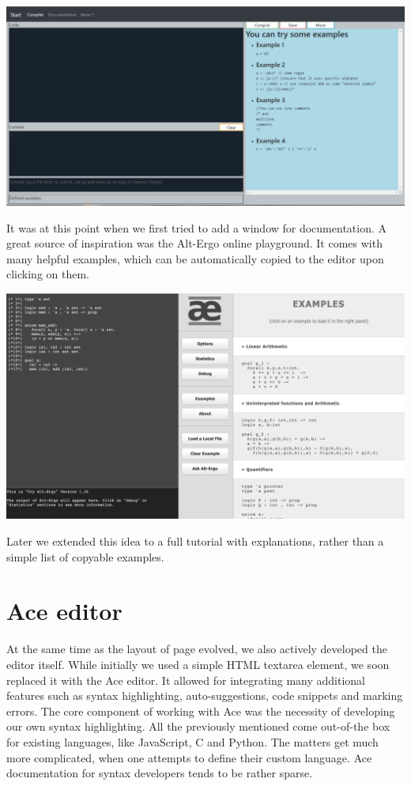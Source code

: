 \begin{center}
     \includegraphics[scale=0.2]{web6.png}
\end{center}
It was at this point when we first tried to add a window for documentation. A great source of inspiration was the Alt-Ergo online playground. It comes with many helpful examples, which can be automatically copied to the editor upon clicking on them.
\begin{center}
     \includegraphics[scale=0.3]{alt-ergo.png}
\end{center}
Later we extended this idea to a full tutorial with explanations, rather than a simple list of copyable examples. 

\section{Ace editor}

At the same time as the layout of page evolved, we also actively developed the editor itself. While initially we used a simple HTML textarea element, we soon replaced it with the Ace editor. It allowed for integrating many additional features such as syntax highlighting, auto-suggestions, code snippets and marking errors. The core component of working with Ace was the necessity of developing our own syntax highlighting. All the previously mentioned come out-of-the box for existing languages, like JavaScript, C and Python. The matters get much more complicated, when one attempts to define their custom language. Ace documentation for syntax developers tends to be rather sparse. 

